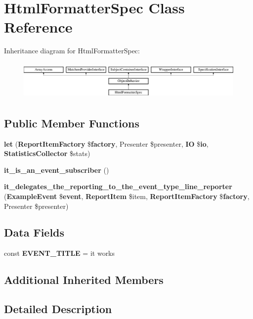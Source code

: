 \section{Html\+Formatter\+Spec Class Reference}
\label{classspec_1_1_php_spec_1_1_formatter_1_1_html_formatter_spec}
Inheritance diagram for Html\+Formatter\+Spec\+:\begin{figure}[H]
\begin{center}
\leavevmode
\includegraphics[height=1.953488cm]{classspec_1_1_php_spec_1_1_formatter_1_1_html_formatter_spec}
\end{center}
\end{figure}
\subsection*{Public Member Functions}
\begin{DoxyCompactItemize}
\item 
{\bf let} ({\bf Report\+Item\+Factory} \${\bf factory}, Presenter \$presenter, {\bf I\+O} \${\bf io}, {\bf Statistics\+Collector} \$stats)
\item 
{\bf it\+\_\+is\+\_\+an\+\_\+event\+\_\+subscriber} ()
\item 
{\bf it\+\_\+delegates\+\_\+the\+\_\+reporting\+\_\+to\+\_\+the\+\_\+event\+\_\+type\+\_\+line\+\_\+reporter} ({\bf Example\+Event} \${\bf event}, {\bf Report\+Item} \$item, {\bf Report\+Item\+Factory} \${\bf factory}, Presenter \$presenter)
\end{DoxyCompactItemize}
\subsection*{Data Fields}
\begin{DoxyCompactItemize}
\item 
const {\bf E\+V\+E\+N\+T\+\_\+\+T\+I\+T\+L\+E} = \textquotesingle{}it works\textquotesingle{}
\end{DoxyCompactItemize}
\subsection*{Additional Inherited Members}


\subsection{Detailed Description}


